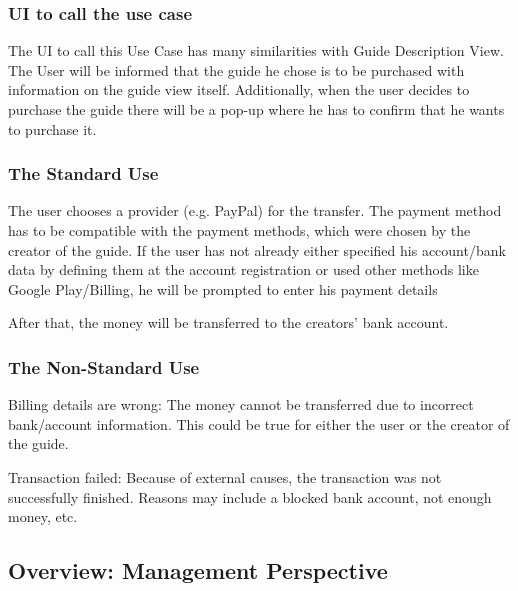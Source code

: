 \documentclass[12pt]{article}
\theoremstyle{definition}
\newenvironment{text}{
   \setlength{\parindent}{0pt}
   \color{black}
}{}
\begin{document}
    \subsubsection{UI to call the use case}
    \begin{text}
    The UI to call this Use Case has many similarities with Guide Description View. The User will be informed that the guide he chose is to be purchased with information on the guide view itself. Additionally, when the user decides to purchase the guide there will be a pop-up where he has to confirm that he wants to purchase it.
    \end{text}
    
    \subsubsection{The Standard Use}
    \begin{text}
    The user chooses a provider (e.g. PayPal) for the transfer. The payment method has to be compatible with the payment methods, which were chosen by the creator of the guide. If the user has not already either specified his account/bank data by defining them at the account registration or used other methods like Google Play/Billing, he will be prompted to enter his payment details
    
    After that, the money will be transferred to the creators' bank account.   
    \end{text}
    
    \subsubsection{The Non-Standard Use}
    \begin{text}
    Billing details are wrong: The money cannot be transferred due to incorrect bank/account information. This could be true for either the user or the creator of the guide.
    
    Transaction failed: Because of external causes, the transaction was not successfully finished. Reasons may include a blocked bank account, not enough money, etc.
    \end{text}
    
\pagebreak

\subsection{Overview: Management Perspective }
\end{document}
